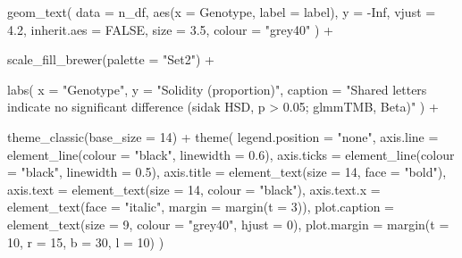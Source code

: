 \documentclass[
  letterpaper,
  DIV=11,
  numbers=noendperiod]{scrartcl}
\newenvironment{Shaded}{\begin{snugshade}}{\end{snugshade}}
\newcommand{\AttributeTok}[1]{\textcolor[rgb]{0.40,0.45,0.13}{#1}}
\newcommand{\ConstantTok}[1]{\textcolor[rgb]{0.56,0.35,0.01}{#1}}
\newcommand{\DecValTok}[1]{\textcolor[rgb]{0.68,0.00,0.00}{#1}}
\newcommand{\FloatTok}[1]{\textcolor[rgb]{0.68,0.00,0.00}{#1}}
\newcommand{\FunctionTok}[1]{\textcolor[rgb]{0.28,0.35,0.67}{#1}}
\newcommand{\NormalTok}[1]{\textcolor[rgb]{0.00,0.23,0.31}{#1}}
\newcommand{\SpecialCharTok}[1]{\textcolor[rgb]{0.37,0.37,0.37}{#1}}
\newcommand{\StringTok}[1]{\textcolor[rgb]{0.13,0.47,0.30}{#1}}
\newcounter{none} %
\begin{document}
\begin{Shaded}
\begin{Highlighting}[]
  \FunctionTok{geom\_text}\NormalTok{(}
    \AttributeTok{data        =}\NormalTok{ n\_df,}
    \FunctionTok{aes}\NormalTok{(}\AttributeTok{x =}\NormalTok{ Genotype, }\AttributeTok{label =}\NormalTok{ label),}
    \AttributeTok{y           =} \SpecialCharTok{{-}}\ConstantTok{Inf}\NormalTok{,}
    \AttributeTok{vjust       =} \FloatTok{4.2}\NormalTok{,}
    \AttributeTok{inherit.aes =} \ConstantTok{FALSE}\NormalTok{,}
    \AttributeTok{size        =} \FloatTok{3.5}\NormalTok{,}
    \AttributeTok{colour      =} \StringTok{"grey40"}
\NormalTok{  ) }\SpecialCharTok{+}

  \FunctionTok{scale\_fill\_brewer}\NormalTok{(}\AttributeTok{palette =} \StringTok{"Set2"}\NormalTok{) }\SpecialCharTok{+}

  \FunctionTok{labs}\NormalTok{(}
    \AttributeTok{x       =} \StringTok{"Genotype"}\NormalTok{,}
    \AttributeTok{y       =} \StringTok{"Solidity (proportion)"}\NormalTok{,}
    \AttributeTok{caption =} \StringTok{"Shared letters indicate no significant difference (sidak HSD, p \textgreater{} 0.05; glmmTMB, Beta)"}
\NormalTok{  ) }\SpecialCharTok{+}

  \FunctionTok{theme\_classic}\NormalTok{(}\AttributeTok{base\_size =} \DecValTok{14}\NormalTok{) }\SpecialCharTok{+}
  \FunctionTok{theme}\NormalTok{(}
    \AttributeTok{legend.position =} \StringTok{"none"}\NormalTok{,}
    \AttributeTok{axis.line       =} \FunctionTok{element\_line}\NormalTok{(}\AttributeTok{colour =} \StringTok{"black"}\NormalTok{, }\AttributeTok{linewidth =} \FloatTok{0.6}\NormalTok{),}
    \AttributeTok{axis.ticks      =} \FunctionTok{element\_line}\NormalTok{(}\AttributeTok{colour =} \StringTok{"black"}\NormalTok{, }\AttributeTok{linewidth =} \FloatTok{0.5}\NormalTok{),}
    \AttributeTok{axis.title      =} \FunctionTok{element\_text}\NormalTok{(}\AttributeTok{size =} \DecValTok{14}\NormalTok{, }\AttributeTok{face =} \StringTok{"bold"}\NormalTok{),}
    \AttributeTok{axis.text       =} \FunctionTok{element\_text}\NormalTok{(}\AttributeTok{size =} \DecValTok{14}\NormalTok{, }\AttributeTok{colour =} \StringTok{"black"}\NormalTok{),}
    \AttributeTok{axis.text.x     =} \FunctionTok{element\_text}\NormalTok{(}\AttributeTok{face =} \StringTok{"italic"}\NormalTok{, }\AttributeTok{margin =} \FunctionTok{margin}\NormalTok{(}\AttributeTok{t =} \DecValTok{3}\NormalTok{)),}
    \AttributeTok{plot.caption    =} \FunctionTok{element\_text}\NormalTok{(}\AttributeTok{size =} \DecValTok{9}\NormalTok{, }\AttributeTok{colour =} \StringTok{"grey40"}\NormalTok{, }\AttributeTok{hjust =} \DecValTok{0}\NormalTok{),}
    \AttributeTok{plot.margin     =} \FunctionTok{margin}\NormalTok{(}\AttributeTok{t =} \DecValTok{10}\NormalTok{, }\AttributeTok{r =} \DecValTok{15}\NormalTok{, }\AttributeTok{b =} \DecValTok{30}\NormalTok{, }\AttributeTok{l =} \DecValTok{10}\NormalTok{)}
\NormalTok{  )}


\end{Highlighting}
\end{Shaded}
\end{document}
